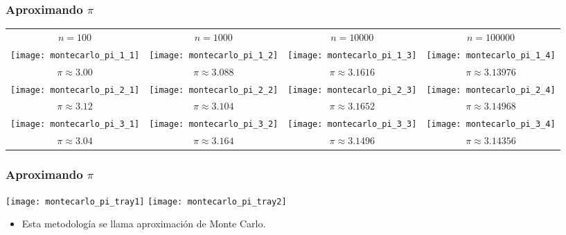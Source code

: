 \documentclass[table]{beamer}
\begin{document}
\begin{frame}
    \frametitle{Aproximando $\pi$}
    \begin{center}
        \setlength{\tabcolsep}{0pt}
        \begin{tabular}{cccc}
            $n = 100$ & $n = 1000$ & $n =10000$ & $n = 100000$ \\
            \texttt{[image: montecarlo\_pi\_1\_1]}
            & \texttt{[image: montecarlo\_pi\_1\_2]}
            & \texttt{[image: montecarlo\_pi\_1\_3]}
            & \texttt{[image: montecarlo\_pi\_1\_4]}
            \\
            $\pi \approx 3.00$
            & $\pi \approx 3.088$
            & $\pi \approx 3.1616$
            & $\pi \approx 3.13976$
            \\
            \texttt{[image: montecarlo\_pi\_2\_1]}
            & \texttt{[image: montecarlo\_pi\_2\_2]}
            & \texttt{[image: montecarlo\_pi\_2\_3]}
            & \texttt{[image: montecarlo\_pi\_2\_4]}
            \\
            $\pi \approx 3.12$
            & $\pi \approx 3.104$
            & $\pi \approx 3.1652$
            & $\pi \approx 3.14968$
            \\
            \texttt{[image: montecarlo\_pi\_3\_1]}
            & \texttt{[image: montecarlo\_pi\_3\_2]}
            & \texttt{[image: montecarlo\_pi\_3\_3]}
            & \texttt{[image: montecarlo\_pi\_3\_4]}
            \\
            $\pi \approx 3.04$
            & $\pi \approx 3.164$
            & $\pi \approx 3.1496$
            & $\pi \approx 3.14356$
        \end{tabular}
    \end{center}
\end{frame}

\begin{frame}
    \frametitle{Aproximando $\pi$}
    \begin{center}
        \texttt{[image: montecarlo\_pi\_tray1]}
        \texttt{[image: montecarlo\_pi\_tray2]}
    \end{center}
    \begin{block}{}
        \begin{itemize}
            \item Esta metodología se llama aproximación de Monte Carlo.
        \end{itemize}
    \end{block}
\end{frame}
\end{document}
